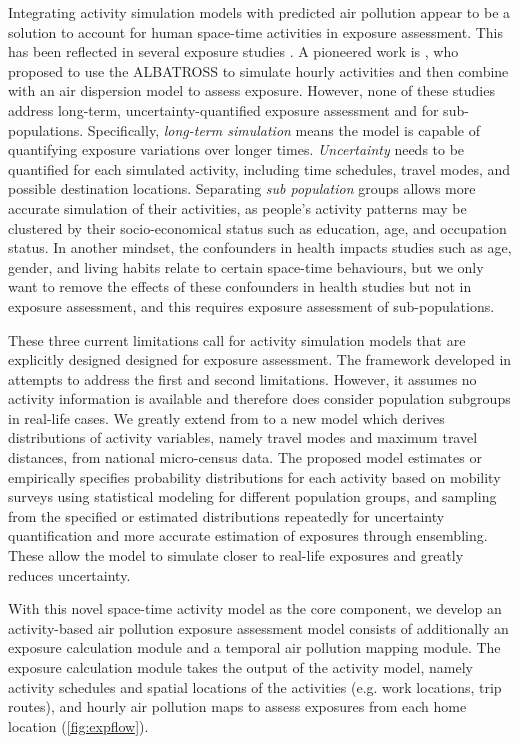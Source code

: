 \documentclass[]{article}
\begin{document}
Integrating activity simulation models with predicted air pollution appear to be a solution to account for human space-time activities in exposure assessment. This has been reflected in several exposure studies \citep{shekarrizfard2017regional,deffner2016personal,gulliver2005time,dons2011impact}. A pioneered work is \cite{beckx2009dynamic}, who proposed to use the ALBATROSS to simulate hourly activities and then combine with an air dispersion model to assess exposure. However, none of these studies address long-term, uncertainty-quantified exposure assessment and for sub-populations. Specifically, \textit{long-term simulation} means the model is capable of quantifying exposure variations over longer times. \textit{Uncertainty} needs to be quantified for each simulated activity, including time schedules, travel modes, and possible destination locations. Separating \textit{sub population} groups allows more accurate simulation of their activities, as people's activity patterns may be clustered by their socio-economical status such as education, age, and occupation status. In another mindset, the confounders in health impacts studies such as age, gender, and living habits relate to certain space-time behaviours, but we only want to remove the effects of these confounders in health studies but not in exposure assessment, and this requires exposure assessment of sub-populations.  

These three current limitations call for activity simulation models that are explicitly designed designed for exposure assessment. The framework developed in \cite{lu2019activity} attempts to address the first and second limitations. However, it assumes no activity information is available and therefore does consider population subgroups in real-life cases. We greatly extend from \cite{lu2019activity} to a new model which derives distributions of activity variables, namely travel modes and maximum travel distances, from national micro-census data. The proposed model estimates or empirically specifies probability distributions for each activity based on mobility surveys using statistical modeling for different population groups, and sampling from the specified or estimated distributions repeatedly for uncertainty quantification and more accurate estimation of exposures through ensembling. These allow the model to simulate closer to real-life exposures and greatly reduces uncertainty. 
    

With this novel space-time activity model as the core component, we develop an activity-based air pollution exposure assessment model consists of additionally an exposure calculation module and a temporal air pollution mapping module. The exposure calculation module takes the output of the activity model, namely activity schedules and spatial locations of the activities (e.g. work locations, trip routes), and hourly air pollution maps to assess exposures from each home location (\cref{fig:expflow}).     
\end{document}
